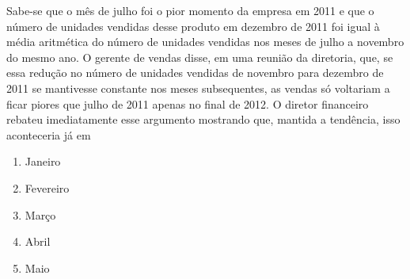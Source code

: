 \begin{enumerate}
\begin{center}
  \end{center}

  
  Sabe-se que o mês de julho foi o pior momento da empresa em 2011 e que o número de unidades vendidas desse produto em dezembro de 2011 foi igual à média aritmética do número de unidades vendidas nos meses de julho a novembro do mesmo ano. O gerente de vendas disse, em uma reunião da diretoria, que, se essa redução no número de unidades vendidas de novembro para dezembro de 2011 se mantivesse constante nos meses subsequentes, as vendas só voltariam a ficar piores que julho de 2011 apenas no final de 2012. O diretor financeiro rebateu imediatamente esse argumento mostrando que, mantida a tendência, isso aconteceria já em

  \begin{enumerate}
  \item Janeiro
  \item Fevereiro
  \item Março
  \item Abril
  \item Maio
  \end{enumerate}
\end{enumerate}

\ifnum{}
\clearpage
\else
\notasfinais
\fi




\nocite{*}